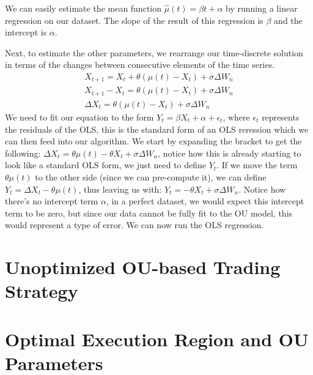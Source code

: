 \documentclass{article}
\begin{document}
\begin{spacing}{2.0}
We can easily estimate the mean function $\hat \mu(t) = \beta t + \alpha$ by running a linear regression on our dataset. The slope of the result of this regression is $\beta$ and
the intercept is $\alpha$.

Next, to estimate the other parameters, we rearrange our time-discrete solution in terms of the changes between consecutive elements of the time series.
\begin{gather*}
    X_{t + 1} = X_{t} + \theta \left ( \mu(t) - X_{t} \right )+ \sigma \Delta W_{n} \\
    X_{t + 1} - X_{t} = \theta \left ( \mu(t) - X_{t} \right )+ \sigma \Delta W_{n} \\
    \Delta X_{t} = \theta \left ( \mu(t) - X_{t} \right )+ \sigma \Delta W_{n}
\end{gather*}
We need to fit our equation to the form $Y_{t} = \beta X_{t} + \alpha + \epsilon_{t}$, where $\epsilon_{t}$ represents the residuals of the OLS, this is the standard form of an OLS
reression which we can then feed into our algorithm. We start by expanding the bracket to get the following:
$\Delta X_{t} = \theta \mu(t) - \theta X_{t} + \sigma \Delta W_{n}$, notice how this is already starting to look like a standard OLS form, we just need to define $Y_{t}$.
If we move the term $\theta \mu(t)$ to the other side (since we can pre-compute it), we can define $Y_{t} = \Delta X_{t} - \theta \mu(t)$, thus leaving us with:
$Y_{t} = - \theta X_{t} + \sigma \Delta W_{n}$. Notice how there's no intercept term $\alpha$, in a perfect dataset, we would expect this intercept term to be zero, but since
our data cannot be fully fit to the OU model, this would represent a type of error. We can now run the OLS regression.


\section{Unoptimized OU-based Trading Strategy}

\section{Optimal Execution Region and OU Parameters}

\end{spacing}
\end{document}
